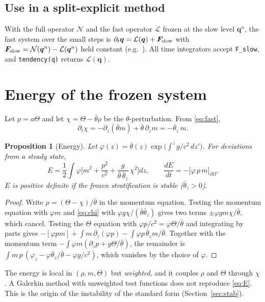 \documentclass[11pt,a4paper]{article}
\newtheorem{proposition}{Proposition}
\newcommand{\q}{\bm q}
\newcommand{\thb}{\bar\theta}
\begin{document}
\subsection{Use in a split-explicit method}
With the full operator $\mathcal N$ and the fast operator $\mathcal L$ frozen at the slow level
$\q^n$, the fast system over the small steps is
$\partial_t\q=\mathcal L(\q)+\bm F_{\rm slow}$ with
$\bm F_{\rm slow}=\mathcal N(\q^n)-\mathcal L(\q^n)$ held constant (e.g.~\cite{wicker2002}). All
time integrators accept \texttt{F\_slow}, and \texttt{tendency(q)} returns $\mathcal L(\q)$.

\section{Energy of the frozen system}
Let $p=a\Theta$ and let $\chi=\Theta-\thb\rho$ be the $\theta$-perturbation. From
\eqref{eq:fast},
\begin{equation}\label{eq:chi}
\partial_t\chi = -\partial_z(\thb m)+\thb\,\partial_z m = -\thb_z\,m .
\end{equation}
\begin{proposition}[Energy]\label{prop:energy}
Let $\varphi(z)=\thb(z)\exp\!\big(\int^z g/c^2\,dz'\big)$. For deviations from a steady state,
\begin{equation}\label{eq:E}
E=\frac12\int\varphi\Big[m^2+\frac{p^2}{c^2}+\frac{g}{\thb\,\thb_z}\,\chi^2\Big]dz,
\qquad \frac{dE}{dt}=-\big[\varphi\,p\,m\big]_{\partial\Omega}.
\end{equation}
$E$ is positive definite if the frozen stratification is stable ($\thb_z>0$).
\end{proposition}
\begin{proof}
Write $\rho=(\Theta-\chi)/\thb$ in the momentum equation. Testing the momentum equation with
$\varphi m$ and \eqref{eq:chi} with $\varphi g\chi/(\thb\thb_z)$ gives two terms
$\pm\varphi g m\chi/\thb$, which cancel. Testing the $\Theta$ equation with
$\varphi p/c^2=\varphi\Theta/\thb$ and integrating by parts gives
$-[\varphi p m]+\int m\,\partial_z(\varphi p)-\int\varphi p\,\thb_z m/\thb$. Together with the
momentum term $-\int\varphi m(\partial_z p+g\Theta/\thb)$, the remainder is
$\int m\,p\,(\varphi_z-\varphi\thb_z/\thb-\varphi g/c^2)$, which vanishes by the choice of
$\varphi$.
\end{proof}
The energy is local in $(\rho,m,\Theta)$ but \emph{weighted}, and it couples $\rho$ and $\Theta$
through $\chi$. A Galerkin method with unweighted test functions does not reproduce
\eqref{eq:E}. This is the origin of the instability of the standard form (Section~\ref{sec:stab}).
\end{document}
